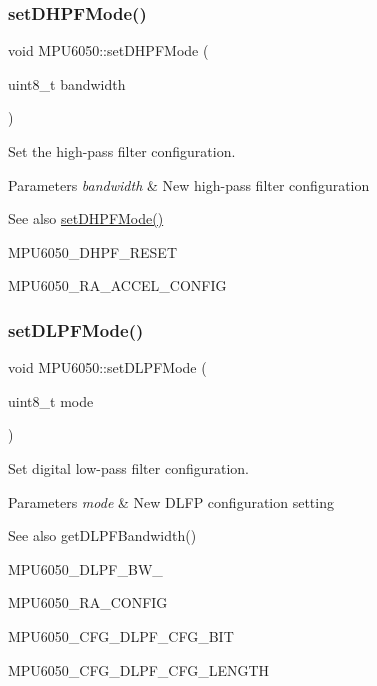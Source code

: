 \subsubsection{\texorpdfstring{setDHPFMode()}{setDHPFMode()}}
{\footnotesize\ttfamily void M\+P\+U6050\+::set\+D\+H\+P\+F\+Mode (\begin{DoxyParamCaption}\item[{uint8\+\_\+t}]{bandwidth }\end{DoxyParamCaption})}

Set the high-\/pass filter configuration. 
\begin{DoxyParams}{Parameters}
{\em bandwidth} & New high-\/pass filter configuration \\
\hline
\end{DoxyParams}
\begin{DoxySeeAlso}{See also}
\mbox{\hyperlink{class_m_p_u6050_a44cc43aaad1e52c1ba3142d4490af611}{set\+D\+H\+P\+F\+Mode()}} 

M\+P\+U6050\+\_\+\+D\+H\+P\+F\+\_\+\+R\+E\+S\+ET 

M\+P\+U6050\+\_\+\+R\+A\+\_\+\+A\+C\+C\+E\+L\+\_\+\+C\+O\+N\+F\+IG 
\end{DoxySeeAlso}
\mbox{\label{class_m_p_u6050_a7a782ade8af2f88dfef7171487f59a3b}} 
\subsubsection{\texorpdfstring{setDLPFMode()}{setDLPFMode()}}
{\footnotesize\ttfamily void M\+P\+U6050\+::set\+D\+L\+P\+F\+Mode (\begin{DoxyParamCaption}\item[{uint8\+\_\+t}]{mode }\end{DoxyParamCaption})}

Set digital low-\/pass filter configuration. 
\begin{DoxyParams}{Parameters}
{\em mode} & New D\+L\+FP configuration setting \\
\hline
\end{DoxyParams}
\begin{DoxySeeAlso}{See also}
get\+D\+L\+P\+F\+Bandwidth() 

M\+P\+U6050\+\_\+\+D\+L\+P\+F\+\_\+\+B\+W\+\_ 

M\+P\+U6050\+\_\+\+R\+A\+\_\+\+C\+O\+N\+F\+IG 

M\+P\+U6050\+\_\+\+C\+F\+G\+\_\+\+D\+L\+P\+F\+\_\+\+C\+F\+G\+\_\+\+B\+IT 

M\+P\+U6050\+\_\+\+C\+F\+G\+\_\+\+D\+L\+P\+F\+\_\+\+C\+F\+G\+\_\+\+L\+E\+N\+G\+TH 
\end{DoxySeeAlso}
\mbox{\label{class_m_p_u6050_a77b36f41c531a11b5a835fc75a9aefe6}} 
